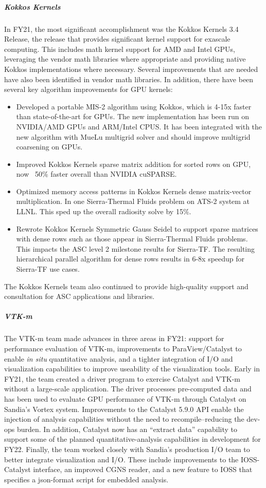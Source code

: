 \subparagraph{Kokkos Kernels} In FY21, the most significant accomplishment was the Kokkos Kernels 3.4 Release, the release that provides significant kernel support for exascale computing.  This includes math kernel support for AMD and Intel GPUs, leveraging the vendor math libraries where appropriate and providing native Kokkos implementations where necessary.  Several improvements that are needed have also been identified in vendor math libraries.  In addition, there have been several key algorithm improvements for GPU kernels:
\begin{itemize}
\item Developed a portable MIS-2 algorithm using Kokkos, which is 4-15x faster than state-of-the-art for GPUs. The new implementation has been run on NVIDIA/AMD GPUs and ARM/Intel CPUS.  It has been integrated with the new algorithm with MueLu multigrid solver and should improve multigrid coarsening on GPUs.
\item Improved Kokkos Kernels sparse matrix addition for sorted rows on GPU, now ~50\% faster overall than NVIDIA cuSPARSE.
\item Optimized memory access patterns in Kokkos Kernels dense matrix-vector multiplication. In one Sierra-Thermal Fluids problem on ATS-2 system at LLNL.  This sped up the overall radiosity solve by 15\%.
\item Rewrote Kokkos Kernels Symmetric Gauss Seidel to support sparse matrices with dense rows such as those appear in Sierra-Thermal Fluids problems. This impacts the ASC level 2 milestone results for Sierra-TF. The resulting hierarchical parallel algorithm for dense rows results in 6-8x speedup for Sierra-TF use cases. 
\end{itemize}

The Kokkos Kernels team also continued to provide high-quality support and consultation for ASC applications and libraries.
 

\subparagraph{VTK-m} The VTK-m team made advances in three areas in FY21: support for performance evaluation of VTK-m, improvements to ParaView/Catalyst to enable \emph{in situ} quantitative analysis, and a tighter integration of I/O and visualization capabilities to improve useability of the visualization tools.  Early in FY21, the team created a driver program to exercise Catalyst and VTK-m without a large-scale application.  The driver processes pre-computed data and has been used to evaluate GPU performance of VTK-m through Catalyst on Sandia's Vortex system. Improvements to the Catalyst 5.9.0 API enable the injection of analysis capabilities without the need to recompile--reducing the dev-ops burden.  In addition, Catalyst now has an ``extract data'' capability to support some of the planned quantitative-analysis capabilities in development for FY22.  Finally, the team worked closely with Sandia's production I/O team to better integrate visualization and I/O.  These include improvements to the IOSS-Catalyst interface, an improved CGNS reader, and a new feature to IOSS that specifies a json-format script for embedded analysis. 

